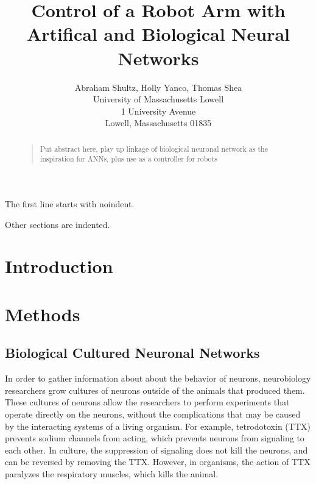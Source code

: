 \documentclass[letterpaper]{article}
\begin{document}
%
\title{Control of a Robot Arm with Artifical and Biological Neural Networks}
\author{Abraham Shultz, Holly Yanco, Thomas Shea\\
University of Massachusetts Lowell\\
1 University Avenue\\
Lowell, Massachusetts 01835\\
}
\maketitle
\begin{abstract}
\begin{quote}
Put abstract here, play up linkage of biological neuronal network as the inspiration for ANNs, plus use as a controller for robots
\end{quote}
\end{abstract}

\noindent The first line starts with noindent. 

Other sections are indented. 

\section{Introduction}


\section{Methods}

\subsection{Biological Cultured Neuronal Networks}

In order to gather information about about the behavior of neurons, neurobiology researchers grow cultures of neurons outside of the animals that produced them. 
These cultures of neurons allow the researchers to perform experiments that operate directly on the neurons, without the complications that may be caused by the interacting systems of a living organism. 
For example, tetrodotoxin (TTX) prevents sodium channels from acting, which prevents neurons from signaling to each other. 
In culture, the suppression of signaling does not kill the neurons, and can be reversed by removing the TTX. 
However, in organisms, the action of TTX paralyzes the respiratory muscles, which kills the animal.  
\end{document}
